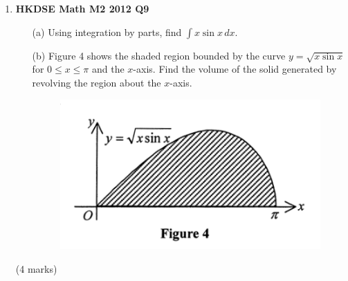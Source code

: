 \documentclass{report}
\begin{document}
\begin{enumerate}
\begin{enumerate}
\begin{enumerate}
			\item [(i)]Find the rate of increase of the depth of coffee when the depth is 3 cm.
			\item [(ii)]Show that $$V = \displaystyle\frac{164\pi}{3} + \frac{3\pi}{64}(h+4)^3$$ for $4\leq h \leq 12$. 
			\item [(iii)]After the cup is fully filled, suddenly it cracks at the bottom. The coffee leaks at a rate of 2 cm$^3$s$^{-1}$. Find the rate of decrease of the depth of coffee after 15 seconds of leaking, giving your answer correct to 3 significant figures.
		\end{enumerate}
		(11 marks)
	\end{enumerate}

	\newpage

	\item \textbf{HKDSE Math M2 2012 Q9}
	\begin{enumerate}
		\item [(a)]Using integration by parts, find $\int x\sin{x}\,dx$. 
		\item [(b)]Figure 4 shows the shaded region bounded by the curve $y = \sqrt{x\sin{x}}$ for $0 \leq x \leq \pi$ and the $x$-axis. Find the volume of the solid generated by revolving the region about the $x$-axis.
	\begin{figure}[H]
		\centering
		\includegraphics[width = .5\linewidth]{2012Figure4}
	\end{figure}
	\end{enumerate}
	(4 marks)

	\newpage


\end{enumerate}
\end{document}
